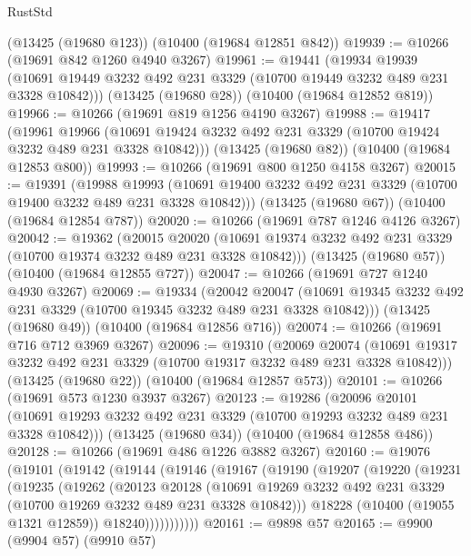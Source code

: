 \begin{lexlean}{RustStd}
\begin{coremodule}
{\begin{coremodule}
{{{{{{{{{{{{{{{{{{{{{{{{{    (@13425 (@19680 @123))
    (@10400 (@19684 @12851 @842))
@19939 := @10266 (@19691 @842 @1260 @4940 @3267)
@19961 := @19441
    (@19934
      @19939
      (@10691 @19449 @3232 @492 @231 @3329 (@10700 @19449 @3232 @489 @231 @3328 @10842)))
    (@13425 (@19680 @28))
    (@10400 (@19684 @12852 @819))
@19966 := @10266 (@19691 @819 @1256 @4190 @3267)
@19988 := @19417
    (@19961
      @19966
      (@10691 @19424 @3232 @492 @231 @3329 (@10700 @19424 @3232 @489 @231 @3328 @10842)))
    (@13425 (@19680 @82))
    (@10400 (@19684 @12853 @800))
@19993 := @10266 (@19691 @800 @1250 @4158 @3267)
@20015 := @19391
    (@19988
      @19993
      (@10691 @19400 @3232 @492 @231 @3329 (@10700 @19400 @3232 @489 @231 @3328 @10842)))
    (@13425 (@19680 @67))
    (@10400 (@19684 @12854 @787))
@20020 := @10266 (@19691 @787 @1246 @4126 @3267)
@20042 := @19362
    (@20015
      @20020
      (@10691 @19374 @3232 @492 @231 @3329 (@10700 @19374 @3232 @489 @231 @3328 @10842)))
    (@13425 (@19680 @57))
    (@10400 (@19684 @12855 @727))
@20047 := @10266 (@19691 @727 @1240 @4930 @3267)
@20069 := @19334
    (@20042
      @20047
      (@10691 @19345 @3232 @492 @231 @3329 (@10700 @19345 @3232 @489 @231 @3328 @10842)))
    (@13425 (@19680 @49))
    (@10400 (@19684 @12856 @716))
@20074 := @10266 (@19691 @716 @712 @3969 @3267)
@20096 := @19310
    (@20069
      @20074
      (@10691 @19317 @3232 @492 @231 @3329 (@10700 @19317 @3232 @489 @231 @3328 @10842)))
    (@13425 (@19680 @22))
    (@10400 (@19684 @12857 @573))
@20101 := @10266 (@19691 @573 @1230 @3937 @3267)
@20123 := @19286
    (@20096
      @20101
      (@10691 @19293 @3232 @492 @231 @3329 (@10700 @19293 @3232 @489 @231 @3328 @10842)))
    (@13425 (@19680 @34))
    (@10400 (@19684 @12858 @486))
@20128 := @10266 (@19691 @486 @1226 @3882 @3267)
@20160 := @19076
    (@19101
      (@19142
        (@19144
          (@19146
            (@19167
              (@19190
                (@19207
                  (@19220
                    (@19231
                      (@19235
                        (@19262
                          (@20123
                            @20128
                            (@10691
                              @19269
                              @3232
                              @492
                              @231
                              @3329
                              (@10700 @19269 @3232 @489 @231 @3328 @10842)))
                          @18228
                          (@10400 (@19055 @1321 @12859))
                          @18240)))))))))))
@20161 := @9898 @57
@20165 := @9900 (@9904 @57) (@9910 @57)
}}}}}}}}}}}}}}}}}}}}}}}}}
\end{coremodule}}
\end{coremodule}
\end{lexlean}
